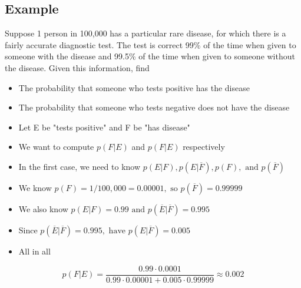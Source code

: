 \documentclass{article}[18pt]
\begin{document}
\subsection{Example}
Suppose 1 person in 100,000 has a particular rare disease, for which
there is a fairly accurate diagnostic test. The test is correct 99\% of the time when
given to someone with the disease and 99.5\% of the time when given to someone
without the disease. Given this information, find
\begin{itemize}
	\item The probability that someone who tests positive has the disease
	\item The probability that someone who tests negative does not have the disease
\end{itemize}
\begin{itemize}
	\item Let E be "tests positive" and F be "has disease"
	\item We want to compute $p(F|E)$ and $p(F|E)$ respectively
	\item In the first case, we need to know $p ( E | F ) , p ( E | \overline { F } ) , p ( F ) , \text { and } p ( \overline { F } )$
	\item We know $p ( F ) = 1 / 100,000 = 0.00001 , \text { so } p ( \overline { F } ) = 0.99999$
	\item We also know $p ( E | F ) = 0.99 \text { and } p ( \overline { E } | \overline { F } ) = 0.995$
	\item Since $p ( \overline { E } | \overline { F } ) = 0.995 , \text { have } p ( E | \overline { F } ) = 0.005$
	\item All in all
\end{itemize}
$$p ( F | E ) = \frac { 0.99 \cdot 0.0001 } { 0.99 \cdot 0.00001 + 0.005 \cdot 0.99999 } \approx 0.002$$
\end{document}

